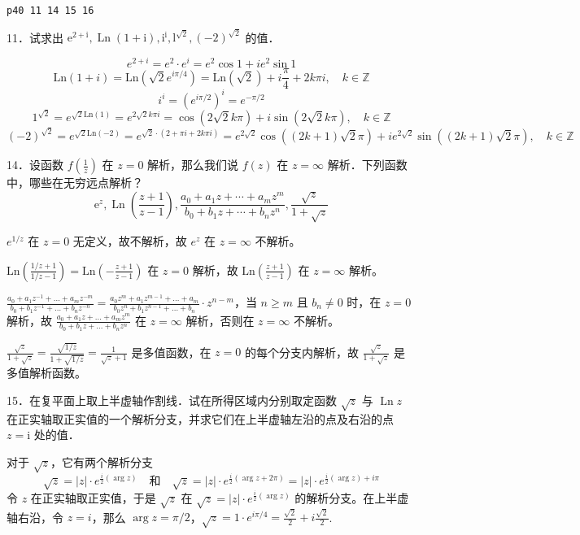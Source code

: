 \begin{lstlisting}
p40 11 14 15 16    
\end{lstlisting}
\begin{exercise}
11．试求出 $\mathrm{e}^{2+\mathrm{i}}, \operatorname{Ln}(1+\mathrm{i}), \mathrm{i}^{\mathrm{i}}, \mathrm{l}^{\sqrt{2}},(-2)^{\sqrt{2}}$ 的值．
\end{exercise}
\[
e^{ 2+i }=e^{2}\cdot e^{ i }=e^{ 2 }\cos1+ie^{ 2 }\sin1
\]
\[
\mathrm{Ln}(1+i)=\mathrm{Ln}(\sqrt{ 2 }e^{ i\pi/4 })=\mathrm{Ln}(\sqrt{ 2 })+i\frac{\pi}{4}+2k\pi i,\quad k\in \mathbb{Z}
\]
\[
i^{i}=(e^{ i\pi/2 })^{i}=e^{ -\pi/2 }
\]
\[
1^{\sqrt{ 2 }}=e^{ \sqrt{ 2 }\mathrm{Ln}(1) }=e^{ 2\sqrt{ 2 }k\pi i}=\cos(2\sqrt{ 2 }k\pi)+i\sin(2\sqrt{ 2 }k\pi),\quad k\in \mathbb{Z}
\]
\[
(-2)^{\sqrt{ 2 }}=e^{ \sqrt{ 2 }\mathrm{Ln}(-2) }=e^{ \sqrt{ 2 }\cdot(2+\pi i+2k\pi i) }=e^{ 2\sqrt{ 2 } }\cos((2k+1)\sqrt{ 2 }\pi )+ie^{ 2\sqrt{ 2 } }\sin((2k+1)\sqrt{ 2 }\pi),\quad k\in \mathbb{Z}
\]
\begin{exercise}
14．设函数 $f\left(\frac{1}{z}\right)$ 在 $z=0$ 解析，那么我们说 $f(z)$ 在 $z=\infty$ 解析．下列函数中，哪些在无穷远点解析？
\[
\mathrm{e}^z, \operatorname{Ln}\left(\frac{z+1}{z-1}\right), \frac{a_0+a_1 z+\cdots+a_m z^m}{b_0+b_1 z+\cdots+b_n z^n}, \frac{\sqrt{z}}{1+\sqrt{z}}
\]
\end{exercise}
$e^{ 1/z  }$ 在 $z=0$ 无定义，故不解析，故 $e^{ z }$ 在 $z=\infty$ 不解析。

$\mathrm{Ln}\left( \frac{1/z+1}{1/z-1} \right)=\mathrm{Ln}\left( -\frac{z+1}{z-1} \right)$ 在 $z=0$ 解析，故 $\mathrm{Ln}\left( \frac{z+1}{z-1} \right)$ 在 $z=\infty$ 解析。

$\frac{a_0+a_1z^{-1}+\dots+a_mz^{-m}}{b_0+b_1z^{-1}+\dots+b_nz^{-n}}=\frac{a_0z^{m}+a_1z^{m-1}+\dots+a_m}{b_0z^{n}+b_1z^{n-1}+\dots+b_n}\cdot z^{n-m}$，当 $n\geq m$ 且 $b_n\neq0$ 时，在 $z=0$ 解析，故 $\frac{a_0+a_1z+\dots+a_mz^{m}}{b_0+b_1z+\dots+b_nz^{n}}$ 在 $z=\infty$ 解析，否则在 $z=\infty$ 不解析。

$\frac{\sqrt{ z }}{1+\sqrt{ z }}=\frac{\sqrt{ 1/z  }}{1+\sqrt{ 1/z  }}=\frac{1}{\sqrt{ z }+1}$ 是多值函数，在 $z=0$ 的每个分支内解析，故 $\frac{\sqrt{ z }}{1+\sqrt{ z }}$ 是多值解析函数。

\begin{exercise}
15．在复平面上取上半虚轴作割线．试在所得区域内分别取定函数 $\sqrt{z}$ 与 $\operatorname{Ln} z$ 在正实轴取正实值的一个解析分支，并求它们在上半虚轴左沿的点及右沿的点 $z=\mathrm{i}$ 处的值．
\end{exercise}
对于 $\sqrt{ z }$，它有两个解析分支
\[
\sqrt{ z }=\lvert z \rvert \cdot e^{ \frac{i}{2}(\arg z) }\quad \text{和}\quad \sqrt{ z }=\lvert z \rvert \cdot e^{ \frac{i}{2}(\arg z+2\pi) }=\lvert z \rvert \cdot e^{ \frac{i}{2}(\arg z)+i\pi }
\]
令 $z$ 在正实轴取正实值，于是 $\sqrt{ z }$ 在 $\sqrt{ z }=\lvert z \rvert \cdot e^{ \frac{i}{2} (\arg z)}$ 的解析分支。在上半虚轴右沿，令 $z=i$，那么 $\arg z=\pi/2$，$\sqrt{ z }=1\cdot e^{ i\pi/4 }=\frac{\sqrt{ 2 }}{2}+i\frac{\sqrt{ 2 }}{2}$.

